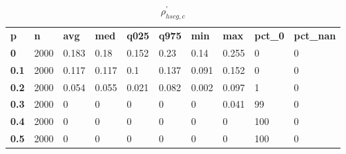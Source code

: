 \begin{table}[h]
 \centering 
\footnotesize
\caption{$\rho_{hscg,c}^\prime $}
\label{tab:alphahscgc}
\begin{tabular}[h]{| l l l l l l l l l l|
    } \hline
\textbf{ p} & \textbf{ n} & \textbf{ avg} & \textbf{ med} & \textbf{ q025} & \textbf{ q975} & \textbf{ min} & \textbf{ max} & \textbf{ pct\_0} & \textbf{ pct\_nan}
           \\
  \textbf{  0} & 2000 & 0.183 &  0.18 & 0.152 &  0.23 &  0.14 & 0.255 &   0 & 0
           \\
  \textbf{0.1} & 2000 & 0.117 & 0.117 &   0.1 & 0.137 & 0.091 & 0.152 &   0 & 0
           \\
  \textbf{0.2} & 2000 & 0.054 & 0.055 & 0.021 & 0.082 & 0.002 & 0.097 &   1 & 0
           \\
  \textbf{0.3} & 2000 &     0 &     0 &     0 &     0 &     0 & 0.041 &  99 & 0
           \\
  \textbf{0.4} & 2000 &     0 &     0 &     0 &     0 &     0 &     0 & 100 & 0
           \\
  \textbf{0.5} & 2000 &     0 &     0 &     0 &     0 &     0 &     0 & 100 & 0
           \\
 \hline \end{tabular}
 \end{table}
